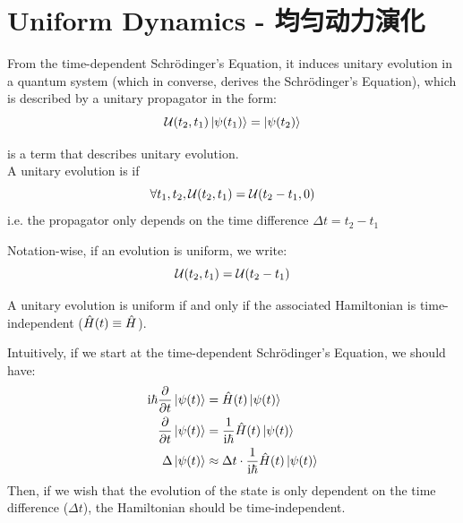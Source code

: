 \section{Uniform Dynamics - 均匀动力演化}
From the time-dependent Schr\"odinger's Equation, it induces unitary evolution in a quantum system (which in converse, derives the Schr\"odinger's Equation), which is described by a unitary propagator in the form:
$$\mathcal{U}(t_2, t_1) \ket{\psi(t_1)} = \ket{\psi(t_2)}$$
\begin{definition}
     is a term that describes unitary evolution. \\
    A unitary evolution is  if
    $$\forall t_1, t_2, \mathcal{U}(t_2, t_1) = \mathcal{U}(t_2 - t_1, 0)$$
    i.e. the propagator only depends on the time difference $\Delta t= t_2 - t_1$
\end{definition}
Notation-wise, if an evolution is uniform, we write:
$$\mathcal{U}(t_2, t_1) = \mathcal{U}(t_2 - t_1)$$
\begin{theorem}
    A unitary evolution is uniform if and only if the associated Hamiltonian is time-independent ($\hat{H}(t) \equiv \hat{H}$).
\end{theorem}
Intuitively, if we start at the time-dependent Schr\"odinger's Equation, we should have:
\begin{align*}
    \mathrm{i} \hbar \pdv{t}\ket{\psi(t)} &= \hat{H}(t) \ket{\psi(t)} \\
    \pdv{t} \ket{\psi(t)} &= \frac{1}{\mathrm{i} \hbar} \hat{H}(t) \ket{\psi(t)} \\
    \Delta \ket{\psi(t)} & \approx \Delta t \cdot \frac{1}{\mathrm{i} \hbar} \hat{H}(t) \ket{\psi(t)}
\end{align*}
Then, if we wish that the evolution of the state is only dependent on the time difference ($\Delta t$), the Hamiltonian should be time-independent.
